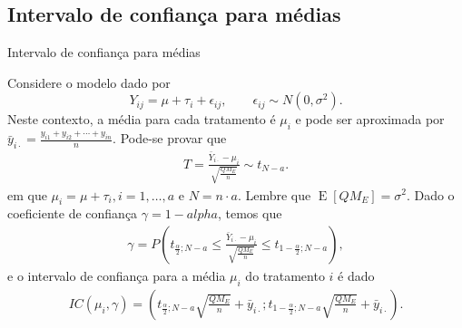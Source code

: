 \documentclass[8pt]{beamer}
\DeclareMathOperator{\espe}{E}
\begin{document}
\subsection{Intervalo de confiança para médias}

\begin{frame}{Intervalo de confiança para médias}

Considere o modelo dado por
$$Y_{ij} = \mu + \tau_i  + \epsilon_{ij}, \qquad \epsilon_{ij} \sim N(0, \sigma^2).$$
Neste contexto, a média para cada tratamento é $\mu_i$ e pode ser aproximada por $\bar{y}_{i\cdot} = \frac{y_{i1} + y_{i2} + \cdots + y_{in}}{n} $. Pode-se provar que
\begin{align*}
	T = \frac{\bar{Y}_{i\cdot} - \mu_i}{\sqrt{\frac{QM_E}{n}}} \sim  t_{N - a}.
\end{align*}
em que $\mu_i=\mu+\tau_i,i =1, \dots, a$ e $N = n \cdot a$. Lembre que $\espe\left[QM_E\right] = \sigma^2$. Dado o coeficiente de confiança $\gamma=1-alpha$, temos que
\begin{align*}
\gamma = P\left( t_{\frac{\alpha}{2};N - a} \leq \frac{\bar{Y}_{i\cdot} - \mu_i}{\sqrt{\frac{QM_E}{n}}} \leq t_{1-\frac{\alpha}{2};N - a}  \right),
\end{align*}
e o intervalo de confiança para a média $\mu_i$ do tratamento  $i$ é dado
\begin{align*}
IC(\mu_i, \gamma) = \left( t_{\frac{\alpha}{2};N - a} \sqrt{\frac{QM_E}{n}} + \bar{y}_{i\cdot}; t_{1-\frac{\alpha}{2};N - a} \sqrt{\frac{QM_E}{n}} + \bar{y}_{i\cdot} \right).
\end{align*}
\end{frame}
\end{document}
